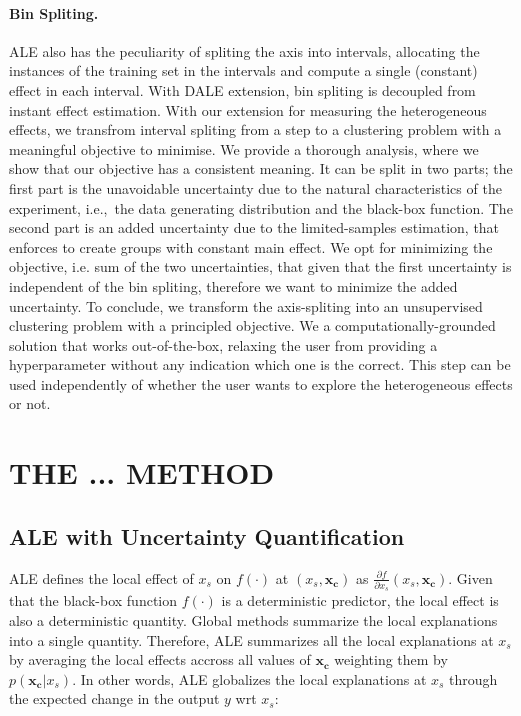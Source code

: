\documentclass[twoside]{article}
\newcommand{\dfdx}{\frac{\partial f}{\partial x_s}}
\newcommand{\xc}{\mathbf{x_c}}
\begin{document}
\paragraph{Bin Spliting.} ALE also has the peculiarity of spliting the
axis into intervals, allocating the instances of the training set in
the intervals and compute a single (constant) effect in each
interval. With DALE extension, bin spliting is decoupled from instant
effect estimation. With our extension for measuring the heterogeneous
effects, we transfrom interval spliting from a step to a clustering
problem with a meaningful objective to minimise. We provide a thorough
analysis, where we show that our objective has a consistent
meaning. It can be split in two parts; the first part is the
unavoidable uncertainty due to the natural characteristics of the
experiment, i.e.,~the data generating distribution and the black-box
function. The second part is an added uncertainty due to the
limited-samples estimation, that enforces to create groups with
constant main effect. We opt for minimizing the objective, i.e. sum of
the two uncertainties, that given that the first uncertainty is
independent of the bin spliting, therefore we want to minimize the
added uncertainty. To conclude, we transform the axis-spliting into an
unsupervised clustering problem with a principled objective. We a
computationally-grounded solution that works out-of-the-box, relaxing
the user from providing a hyperparameter without any indication which
one is the correct. This step can be used independently of whether the
user wants to explore the heterogeneous effects or not.

\section{THE ... METHOD}

\subsection{ALE with Uncertainty Quantification}

ALE defines the local effect of \(x_s\) on \(f(\cdot)\) at
\((x_s, \xc)\) as \(\dfdx (x_s, \xc)\). Given that the black-box
function \(f(\cdot)\) is a deterministic predictor, the local effect
is also a deterministic quantity. Global methods summarize the local
explanations into a single quantity. Therefore, ALE summarizes all the
local explanations at \(x_s\) by averaging the local effects accross
all values of \(\xc\) weighting them by \(p(\xc|x_s)\). In other
words, ALE globalizes the local explanations at \(x_s\) through the
expected change in the output \(y\) wrt \(x_s\):
\end{document}
